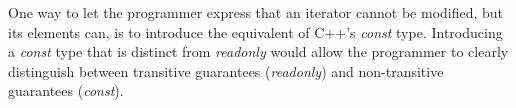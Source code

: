 \documentclass[letterpaper,11pt]{article}
\newcommand{\code}[1]{\lstinline$#1$}
\theoremstyle{definition}
\theoremstyle{remark}
\begin{document}
\begin{comment}
\begin{lstlisting}
trait IteratorOverList[+A] {
	var list: List[A]
	def peek(): A = list.head
}
val iterator = new IteratorOverList[AnyRef @mutable] @readonly { var list = ... }
\end{lstlisting}

The concrete instantiation of \code{IteratorOverList} will have the following definition of \code{peek}
(shown with an explicit receiver \code{this}):

\begin{lstlisting}
def peek(this: IteratorOverList[AnyRef @mutable] @readonly): AnyRef @mutable = this.list.head
\end{lstlisting}

Under definition~\ref{accesspath-ri-def}, this version of method \code{peek()} should fail
to type-check because the type of \code{this.list.head} would be \emph{readonly},
which is incompatible with \code{AnyRef @mutable}.
Scala, however, would not consider this to be a type error because the original definition
of \code{peek()} type-checks.
One option is to allow this situation to type-check correctly,
but at the cost of allowing strong \emph{readonly} guarantees to be broken
where certain uses of generic types are involved.

If we enforce the deep (transitive) guarantees of RI types even where generics are involved,
we need to add some default restrictions on type parameters.
Ideally, these guarantees would be modularly checkable and enforceable (for example,
we shouldn't have to re-check the definition of \code{peek} everywhere
\code{IteratorOverList} is extended).
We plan to consider these choices in greater detail as work progresses.
\end{comment}

One way to
let the programmer express that an iterator cannot be modified, but its
elements can,
is to introduce 
the equivalent
of C++'s \emph{const} type.
Introducing a \emph{const} type that is distinct from \emph{readonly}
would allow the programmer to clearly distinguish between
transitive guarantees (\emph{readonly}) and non-transitive guarantees (\emph{const}).

\begin{comment}
Under the assumption that all types are shallow (nontransitive), this

trait X {
	// if T has a lower bound of X:
	//   X mutable -> T anything
	//   X polyread -> T readonly or polyread
	//   X readonly -> T readonly
	type T
	val t: T
}
\end{comment}
\end{document}
